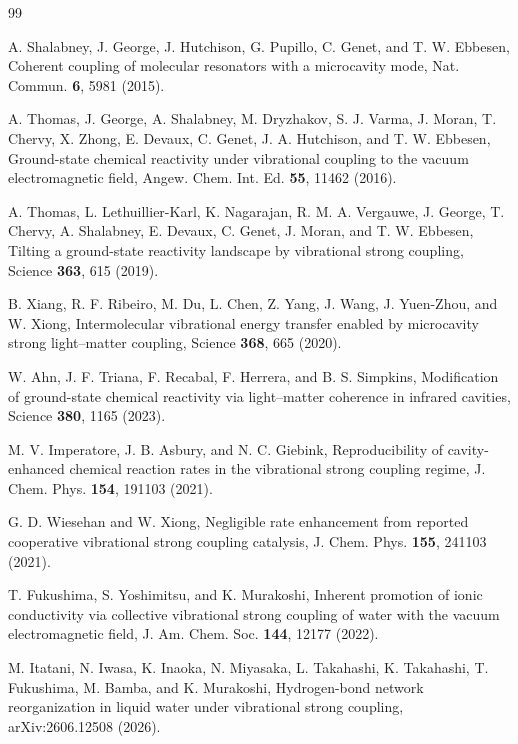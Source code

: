 \documentclass[aps,prb,reprint,superscriptaddress,nofootinbib,floatfix]{revtex4-2}
\begin{document}
\begin{thebibliography}{99}

 A. Shalabney, J. George, J. Hutchison, G. Pupillo, C. Genet,
and T. W. Ebbesen, Coherent coupling of molecular resonators with a microcavity mode,
Nat. Commun. \textbf{6}, 5981 (2015).

 A. Thomas, J. George, A. Shalabney, M. Dryzhakov, S. J. Varma,
J. Moran, T. Chervy, X. Zhong, E. Devaux, C. Genet, J. A. Hutchison, and
T. W. Ebbesen, Ground-state chemical reactivity under vibrational coupling to the
vacuum electromagnetic field, Angew. Chem. Int. Ed. \textbf{55}, 11462 (2016).

 A. Thomas, L. Lethuillier-Karl, K. Nagarajan, R. M. A. Vergauwe,
J. George, T. Chervy, A. Shalabney, E. Devaux, C. Genet, J. Moran, and T. W. Ebbesen,
Tilting a ground-state reactivity landscape by vibrational strong coupling, Science
\textbf{363}, 615 (2019).

 B. Xiang, R. F. Ribeiro, M. Du, L. Chen, Z. Yang, J. Wang,
J. Yuen-Zhou, and W. Xiong, Intermolecular vibrational energy transfer enabled by
microcavity strong light--matter coupling, Science \textbf{368}, 665 (2020).

 W. Ahn, J. F. Triana, F. Recabal, F. Herrera, and B. S. Simpkins,
Modification of ground-state chemical reactivity via light--matter coherence in
infrared cavities, Science \textbf{380}, 1165 (2023).

 M. V. Imperatore, J. B. Asbury, and N. C. Giebink,
Reproducibility of cavity-enhanced chemical reaction rates in the vibrational strong
coupling regime, J. Chem. Phys. \textbf{154}, 191103 (2021).

 G. D. Wiesehan and W. Xiong, Negligible rate enhancement from
reported cooperative vibrational strong coupling catalysis, J. Chem. Phys.
\textbf{155}, 241103 (2021).

 T. Fukushima, S. Yoshimitsu, and K. Murakoshi, Inherent
promotion of ionic conductivity via collective vibrational strong coupling of water
with the vacuum electromagnetic field, J. Am. Chem. Soc. \textbf{144}, 12177 (2022).

 M. Itatani, N. Iwasa, K. Inaoka, N. Miyasaka, L. Takahashi,
K. Takahashi, T. Fukushima, M. Bamba, and K. Murakoshi, Hydrogen-bond network
reorganization in liquid water under vibrational strong coupling, arXiv:2606.12508
(2026).


\end{thebibliography}
\end{document}
